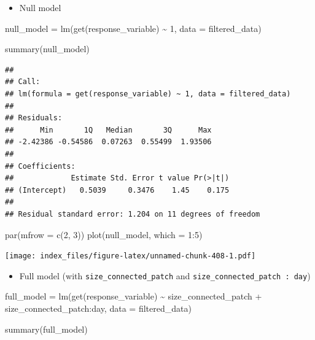 \documentclass[
]{article}
\newenvironment{Shaded}{\begin{snugshade}}{\end{snugshade}}
\newcommand{\AttributeTok}[1]{\textcolor[rgb]{0.77,0.63,0.00}{#1}}
\newcommand{\DecValTok}[1]{\textcolor[rgb]{0.00,0.00,0.81}{#1}}
\newcommand{\FunctionTok}[1]{\textcolor[rgb]{0.00,0.00,0.00}{#1}}
\newcommand{\NormalTok}[1]{#1}
\newcommand{\OtherTok}[1]{\textcolor[rgb]{0.56,0.35,0.01}{#1}}
\newcommand{\SpecialCharTok}[1]{\textcolor[rgb]{0.00,0.00,0.00}{#1}}
\providecommand{\tightlist}{%
  \setlength{\itemsep}{0pt}\setlength{\parskip}{0pt}}
\begin{document}
\begin{itemize}
\tightlist
\item
  Null model
\end{itemize}

\begin{Shaded}
\begin{Highlighting}[]
\NormalTok{null\_model }\OtherTok{=} \FunctionTok{lm}\NormalTok{(}\FunctionTok{get}\NormalTok{(response\_variable) }\SpecialCharTok{\textasciitilde{}}
                  \DecValTok{1}\NormalTok{,}
                \AttributeTok{data =}\NormalTok{ filtered\_data)}

\FunctionTok{summary}\NormalTok{(null\_model)}
\end{Highlighting}
\end{Shaded}

\begin{verbatim}
## 
## Call:
## lm(formula = get(response_variable) ~ 1, data = filtered_data)
## 
## Residuals:
##      Min       1Q   Median       3Q      Max 
## -2.42386 -0.54586  0.07263  0.55499  1.93506 
## 
## Coefficients:
##             Estimate Std. Error t value Pr(>|t|)
## (Intercept)   0.5039     0.3476    1.45    0.175
## 
## Residual standard error: 1.204 on 11 degrees of freedom
\end{verbatim}

\begin{Shaded}
\begin{Highlighting}[]
\FunctionTok{par}\NormalTok{(}\AttributeTok{mfrow =} \FunctionTok{c}\NormalTok{(}\DecValTok{2}\NormalTok{, }\DecValTok{3}\NormalTok{))}
\FunctionTok{plot}\NormalTok{(null\_model, }\AttributeTok{which =} \DecValTok{1}\SpecialCharTok{:}\DecValTok{5}\NormalTok{)}
\end{Highlighting}
\end{Shaded}

\texttt{[image: index\_files/figure-latex/unnamed-chunk-408-1.pdf]}

\begin{itemize}
\tightlist
\item
  Full model (with \texttt{size\_connected\_patch} and
  \texttt{size\_connected\_patch\ :\ day})
\end{itemize}

\begin{Shaded}
\begin{Highlighting}[]
\NormalTok{full\_model }\OtherTok{=} \FunctionTok{lm}\NormalTok{(}\FunctionTok{get}\NormalTok{(response\_variable) }\SpecialCharTok{\textasciitilde{}}
\NormalTok{                  size\_connected\_patch }\SpecialCharTok{+}
\NormalTok{                  size\_connected\_patch}\SpecialCharTok{:}\NormalTok{day,}
                \AttributeTok{data =}\NormalTok{ filtered\_data)}

\FunctionTok{summary}\NormalTok{(full\_model)}
\end{Highlighting}
\end{Shaded}
\end{document}
